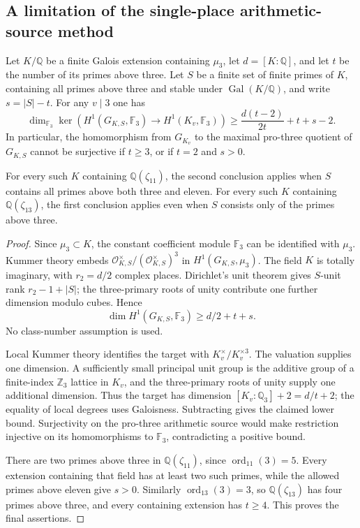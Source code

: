 \subsection{A limitation of the single-place arithmetic-source method}
\label{subsec:source-dimension-obstruction}

\begin{proposition}
\label{prop:pro3-source-dimension-obstruction}
Let $K/\mathbb Q$ be a finite Galois extension containing $\mu_3$,
let $d=[K:\mathbb Q]$, and let $t$ be the number of its primes above
three.  Let $S$ be a finite set of finite primes of $K$, containing
all primes above three and stable under $\operatorname{Gal}(K/\mathbb Q)$,
and write $s=|S|-t$.  For any $v\mid3$ one has
\[
 \dim_{\mathbb F_3}\ker\left(
 H^1(G_{K,S},\mathbb F_3)\longrightarrow H^1(K_v,\mathbb F_3)
 \right)
 \ge \frac{d(t-2)}{2t}+t+s-2.
\]
In particular, the homomorphism from $G_{K_v}$ to the maximal
pro-three quotient of $G_{K,S}$ cannot be surjective if $t\ge3$,
or if $t=2$ and $s>0$.

For every such $K$ containing $\mathbb Q(\zeta_{11})$, the second
conclusion applies when $S$ contains all primes above both three and
eleven.  For every such $K$ containing $\mathbb Q(\zeta_{13})$,
the first conclusion applies even when $S$ consists only of the
primes above three.
\end{proposition}
\begin{proof}
Since $\mu_3\subset K$, the constant coefficient module $\mathbb F_3$
can be identified with $\mu_3$.  Kummer theory embeds
$\mathcal O_{K,S}^{\times}/(\mathcal O_{K,S}^{\times})^3$
in $H^1(G_{K,S},\mu_3)$.  The field $K$ is totally imaginary,
with $r_2=d/2$ complex places.  Dirichlet's unit theorem gives
$S$-unit rank $r_2-1+|S|$; the three-primary roots of unity
contribute one further dimension modulo cubes.  Hence
\[
 \dim H^1(G_{K,S},\mathbb F_3)\ge d/2+t+s.
\]
No class-number assumption is used.

Local Kummer theory identifies the target with $K_v^\times/K_v^{\times3}$.
The valuation supplies one dimension.  A sufficiently small principal
unit group is the additive group of a finite-index $\mathbb Z_3$
lattice in $K_v$, and the three-primary roots of unity supply one
additional dimension.  Thus the target has dimension
$[K_v:\mathbb Q_3]+2=d/t+2$; the equality of local degrees uses
Galoisness.  Subtracting gives the claimed lower bound.  Surjectivity
on the pro-three arithmetic source would make restriction injective
on its homomorphisms to $\mathbb F_3$, contradicting a positive bound.

There are two primes above three in $\mathbb Q(\zeta_{11})$, since
$\operatorname{ord}_{11}(3)=5$.  Every extension containing that
field has at least two such primes, while the allowed primes above
eleven give $s>0$.  Similarly
$\operatorname{ord}_{13}(3)=3$, so $\mathbb Q(\zeta_{13})$ has
four primes above three, and every containing extension has
$t\ge4$.  This proves the final assertions.
\end{proof}

